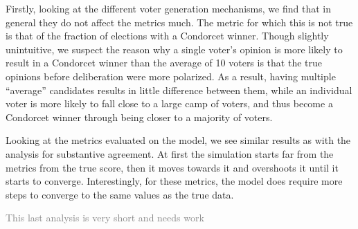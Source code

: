 \documentclass[11pt, oneside, dvipsnames]{Thesis} %
\begin{document}
Firstly, looking at the different voter generation mechanisms, we find that in
general they do not affect the metrics much. The metric for which this is not
true is that of the fraction of elections with a Condorcet winner. Though
slightly unintuitive, we suspect the reason why a single voter's opinion is
more likely to result in a Condorcet winner than the average of 10 voters is
that the true opinions before deliberation were more polarized. As a result,
having multiple ``average'' candidates results in little difference between
them, while an individual voter is more likely to fall close to a large camp of
voters, and thus become a Condorcet winner through being closer to a majority
of voters.

Looking at the metrics evaluated on the model, we see similar results as with
the analysis for substantive agreement. At first the simulation starts far from
the metrics from the true score, then it moves towards it and overshoots it
until it starts to converge. Interestingly, for these metrics, the model does require more steps to converge to the same values as the true data.

\textcolor{gray}{This last analysis is very short and needs work}
\end{document}
